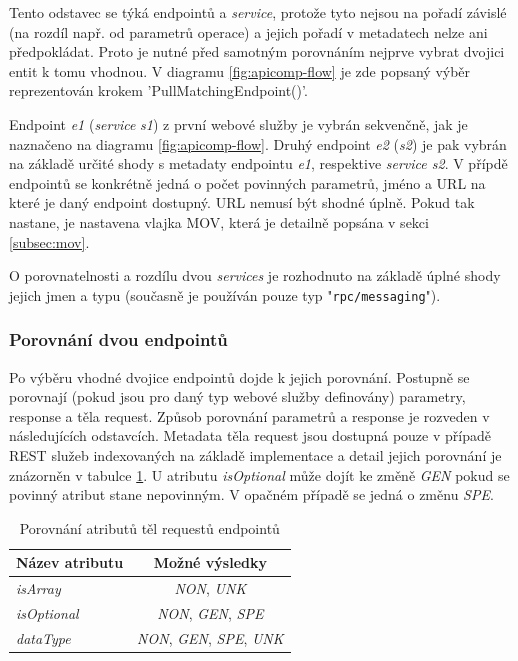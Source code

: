 \documentclass[czech,DP]{thesiskiv}
\begin{document}
Tento odstavec se týká endpointů a \textit{service}, protože tyto nejsou na pořadí závislé (na rozdíl např. od parametrů operace) a jejich pořadí v metadatech nelze ani předpokládat. Proto je nutné před samotným porovnáním nejprve vybrat dvojici entit k tomu vhodnou. V diagramu \ref{fig:apicomp-flow} je zde popsaný výběr reprezentován krokem 'PullMatchingEndpoint()'. 

Endpoint \textit{e1} (\textit{service} \textit{s1})  z první webové služby je vybrán sekvenčně, jak je naznačeno na diagramu \ref{fig:apicomp-flow}. Druhý endpoint \textit{e2} (\textit{s2}) je pak vybrán na základě určité shody s metadaty endpointu \textit{e1}, respektive \textit{service s2}. V přípdě endpointů se konkrétně jedná o počet povinných parametrů, jméno a URL na které je daný endpoint dostupný. URL nemusí být shodné úplně. Pokud tak nastane, je nastavena vlajka MOV, která je detailně popsána v sekci \ref{subsec:mov}.

O porovnatelnosti a rozdílu dvou \textit{services} je rozhodnuto na základě úplné shody jejich jmen a typu (současně je používán pouze typ "\verb|rpc/messaging|").

\subsubsection{Porovnání dvou endpointů}
Po výběru vhodné dvojice endpointů dojde k jejich porovnání. Postupně se porovnají (pokud jsou pro daný typ webové služby definovány) parametry, response a těla request. Způsob porovnání parametrů a response je rozveden v následujících odstavcích. Metadata těla request jsou dostupná pouze v případě REST služeb indexovaných na základě implementace a detail jejich porovnání je znázorněn v tabulce \ref{tab:req-body-cmp}. U atributu \textit{isOptional} může dojít ke změně \textit{GEN} pokud se povinný atribut stane nepovinným. V opačném případě se jedná o změnu \textit{SPE}.

\begin{table}[h]
	\centering
	\begin{tabular}{|l|c|}
		\hline
		Název atributu  & Možné výsledky \\
		\hline
		\hline
		\textit{isArray} & \textit{NON}, \textit{UNK} \\
		\hline
		\textit{isOptional} & \textit{NON}, \textit{GEN}, \textit{SPE} \\
		\hline
		\textit{dataType} & \textit{NON}, \textit{GEN}, \textit{SPE}, \textit{UNK} \\
		\hline
	\end{tabular}
	\caption{Porovnání atributů těl requestů endpointů}
	\label{tab:req-body-cmp}
\end{table}
\end{document}

